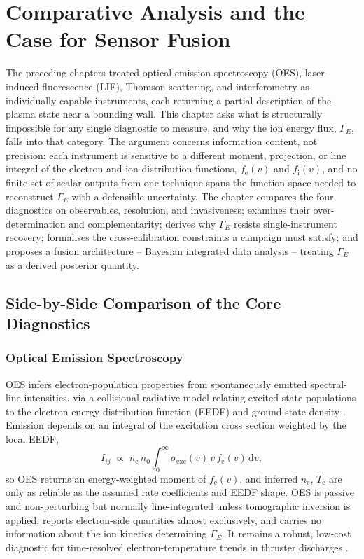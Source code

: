 \chapter{Comparative Analysis and the Case for Sensor Fusion}
\label{ch:fusion}

The preceding chapters treated optical emission spectroscopy (OES), laser-induced fluorescence (LIF), Thomson scattering, and interferometry as individually capable instruments, each returning a partial description of the plasma state near a bounding wall. This chapter asks what is structurally impossible for any single diagnostic to measure, and why the ion energy flux, $\Gamma_{E}$, falls into that category. The argument concerns information content, not precision: each instrument is sensitive to a different moment, projection, or line integral of the electron and ion distribution functions, $f_{\mathrm{e}}(v)$ and $f_{\mathrm{i}}(v)$, and no finite set of scalar outputs from one technique spans the function space needed to reconstruct $\Gamma_{E}$ with a defensible uncertainty. The chapter compares the four diagnostics on observables, resolution, and invasiveness; examines their over-determination and complementarity; derives why $\Gamma_{E}$ resists single-instrument recovery; formalises the cross-calibration constraints a campaign must satisfy; and proposes a fusion architecture -- Bayesian integrated data analysis -- treating $\Gamma_{E}$ as a derived posterior quantity.

\section{Side-by-Side Comparison of the Core Diagnostics}
\label{sec:sidebyside}

\subsection{Optical Emission Spectroscopy}

OES infers electron-population properties from spontaneously emitted spectral-line intensities, via a collisional-radiative model relating excited-state populations to the electron energy distribution function (EEDF) and ground-state density \cite{ref0237}. Emission depends on an integral of the excitation cross section weighted by the local EEDF,
\begin{equation}
I_{ij} \;\propto\; n_{\mathrm{e}} \, n_{0} \int_{0}^{\infty} \sigma_{\mathrm{exc}}(v)\, v \, f_{\mathrm{e}}(v) \, \mathrm{d}v ,
\label{eq:oes_intensity}
\end{equation}
so OES returns an energy-weighted moment of $f_{\mathrm{e}}(v)$, and inferred $n_{\mathrm{e}}$, $T_{\mathrm{e}}$ are only as reliable as the assumed rate coefficients and EEDF shape. OES is passive and non-perturbing but normally line-integrated unless tomographic inversion is applied, reports electron-side quantities almost exclusively, and carries no information about the ion kinetics determining $\Gamma_{E}$. It remains a robust, low-cost diagnostic for time-resolved electron-temperature trends in thruster discharges \cite{ref0256}.

